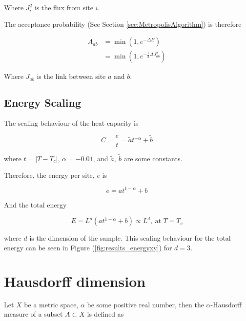 Where $J_i^2$ is the flux from site $i$.

The acceptance probability (See Section \ref{sec:MetropolisAlgorithm}) is therefore

\begin{align}
    A_{ab} &= \min \left ( 1, e^{-\Delta E} \right ) \\
    &= \min \left ( 1, e^{-\frac{1}{2} \Delta J_{ab}^2} \right )
\end{align}

Where $J_{ab}$ is the link between site $a$ and $b$.

\subsection{Energy Scaling}
\label{subsec:xyenergyScaling}

The scaling behaviour of the heat capacity is%

\begin{equation}
    C = \frac{e}{t} = \tilde a t^{-\alpha} + \tilde b
\end{equation}

where $t = |T - T_c|$, $\alpha = -0.01$, and $\tilde a, \ \tilde b$ are some constants.

Therefore, the energy per site, $e$ is

\begin{equation}
    e = a t^{1 - \alpha} + b
\end{equation}

And the total energy

\begin{equation}
    E = L^d ( a t^{1 - \alpha} + b ) \propto L^d, \ \text{at $T = T_c$}
\end{equation}

where $d$ is the dimension of the sample. This scaling behaviour for the total energy can be seen in Figure (\ref{fig:results_energyxy}) for $d = 3$.

\section{Hausdorff dimension}
\label{sec:hausdorffdimension}


Let $X$ be a metric space, $\alpha$ be some positive real number, then the $\alpha$-Hausdorff measure of a subset $A \subset X$ is defined as \cite{Heinonen:HausdorffDimMath}

